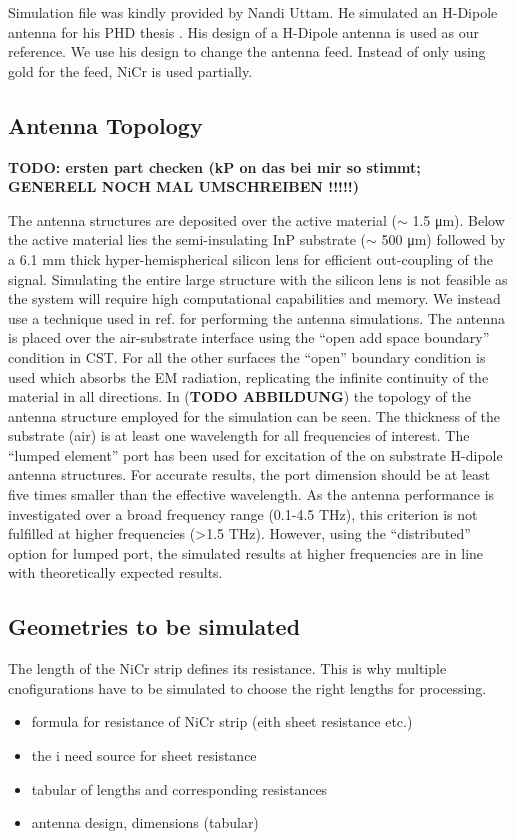 Simulation file was kindly provided by Nandi Uttam. He simulated an H-Dipole antenna for his PHD thesis \cite{nandiErAsInAlGaAsPhotoconductors2021}. His design of a H-Dipole antenna is used as our reference. We use his design to change the antenna feed. Instead of only using gold for the feed, NiCr is used partially. 

\subsection{Antenna Topology}
\textbf{TODO: ersten part checken (kP on das bei mir so stimmt; GENERELL NOCH MAL UMSCHREIBEN !!!!!)}

The antenna structures are deposited over the active material ($\sim$ \num{1.5} \si{\micro\meter}). Below the active material lies the semi-insulating InP substrate ($\sim$ \num{500} \si{\micro\meter}) followed by a \num{6.1} \si{\milli\meter} thick hyper-hemispherical silicon lens for efficient out-coupling of the signal. Simulating the entire large structure with the silicon lens is not feasible as the system will require high computational capabilities and memory. We instead use a technique used in ref. \cite{llombartTHzTimeDomainSensing2012,garufoNortonEquivalentCircuit2018} for performing the antenna simulations. The antenna is placed over the air-substrate interface using the \enquote{open add space boundary} condition in CST. For all the other surfaces the \enquote{open} boundary condition is used which absorbs the EM radiation, replicating the infinite continuity of the material in all directions. In (\textbf{TODO ABBILDUNG}) the topology of the antenna structure employed for the simulation can be seen. The thickness of the substrate (air) is at least one wavelength for all frequencies of interest. The \enquote{lumped element} port has been used for excitation of the on substrate H-dipole antenna structures. For accurate results, the port dimension should be at least five times smaller than the effective wavelength. As the antenna performance is investigated over a broad frequency range (0.1-4.5 THz), this criterion is not fulfilled at higher frequencies (>1.5 THz). However, using the \enquote{distributed} option for lumped port, the simulated results at higher frequencies are in line with theoretically expected results.

\subsection{Geometries to be simulated}
The length of the NiCr strip defines its resistance. This is why multiple cnofigurations have to be simulated to choose the right lengths for processing. 

\begin{itemize}
	\item formula for resistance of NiCr strip (eith sheet resistance etc.)
	\item the i need source for sheet resistance 
	\item tabular of lengths and corresponding resistances 
\end{itemize}


\begin{itemize}
	\item antenna design, dimensions (tabular)
\end{itemize}